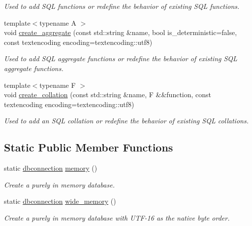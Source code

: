 \begin{DoxyCompactItemize}
\begin{DoxyCompactList}\small\item\em Used to add S\-Q\-L functions or redefine the behavior of existing S\-Q\-L functions. \end{DoxyCompactList}\item 
{\footnotesize template$<$typename A $>$ }\\void \hyperlink{a00004_ab3e54d1eef4c27734e45a61d27be386b}{create\-\_\-aggregate} (const std\-::string \&name, bool is\-\_\-deterministic=false, const textencoding encoding=textencoding\-::utf8)
\begin{DoxyCompactList}\small\item\em Used to add S\-Q\-L aggregate functions or redefine the behavior of existing S\-Q\-L aggregate functions. \end{DoxyCompactList}\item 
{\footnotesize template$<$typename F $>$ }\\void \hyperlink{a00004_ab8c7b939c1b6d41259aefa3b7475f3bd}{create\-\_\-collation} (const std\-::string \&name, F \&\&function, const textencoding encoding=textencoding\-::utf8)
\begin{DoxyCompactList}\small\item\em Used to add an S\-Q\-L collation or redefine the behavior of existing S\-Q\-L collations. \end{DoxyCompactList}\end{DoxyCompactItemize}
\subsection*{Static Public Member Functions}
\begin{DoxyCompactItemize}
\item 
static \hyperlink{a00004}{dbconnection} \hyperlink{a00004_adc0120a0d5d39eabcffb7d641b0c40dd}{memory} ()
\begin{DoxyCompactList}\small\item\em Create a purely in memory database. \end{DoxyCompactList}\item 
static \hyperlink{a00004}{dbconnection} \hyperlink{a00004_abe5e2bf211f18f2f358f4293d3064679}{wide\-\_\-memory} ()
\begin{DoxyCompactList}\small\item\em Create a purely in memory database with U\-T\-F-\/16 as the native byte order. \end{DoxyCompactList}\end{DoxyCompactItemize}


